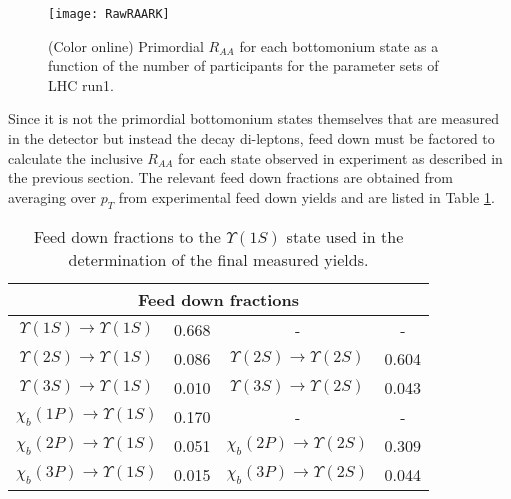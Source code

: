 \begin{figure*}[t!]
\texttt{[image: RawRAARK]}
\caption{
(Color online) Primordial $R_{AA}$ for each bottomonium state as a function of the number of participants for the parameter sets of LHC run1.
}
\label{fig:rawRK}
\end{figure*}

Since it is not the primordial bottomonium states themselves that are measured in the detector but instead the decay di-leptons, feed down must be factored to calculate the inclusive $R_{AA}$ for each state observed in experiment as described in the previous section. The relevant feed down fractions are obtained from averaging over $p_{T}$ from experimental feed down yields \cite{Woeri:2015hq} and are listed in Table \ref{feeddown}.

\begin{table}[t!]
\begin{tabular}{|c|c|c|c|}
\hline
\multicolumn{4}{|c|}{Feed down fractions}\\
\hline
\hline
$\Upsilon(1S) \rightarrow \Upsilon(1S)$ & 0.668 & - & -\\
\hline
$\Upsilon(2S) \rightarrow \Upsilon(1S)$ & 0.086 & $\Upsilon(2S) \rightarrow \Upsilon(2S)$ & 0.604\\
\hline
$\Upsilon(3S) \rightarrow \Upsilon(1S)$ & 0.010 & $\Upsilon(3S) \rightarrow \Upsilon(2S)$ & 0.043\\
\hline
$\chi_{b}(1P) \rightarrow \Upsilon(1S)$ & 0.170 & - & -\\
\hline
$\chi_{b}(2P) \rightarrow \Upsilon(1S)$ & 0.051 & $\chi_{b}(2P) \rightarrow \Upsilon(2S)$ & 0.309\\
\hline
$\chi_{b}(3P) \rightarrow \Upsilon(1S)$ & 0.015 & $\chi_{b}(3P) \rightarrow \Upsilon(2S)$ & 0.044\\
\hline
\end{tabular}
\caption{Feed down fractions to the $\Upsilon(1S)$ state used in the determination of the final measured yields.}
\label{feeddown}
\end{table}

